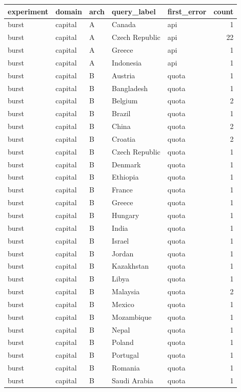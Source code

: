 \begin{tabular}{lllllr}
\toprule
experiment & domain & arch & query_label & first_error & count \\
\midrule
burst & capital & A & Canada & api & 1 \\
burst & capital & A & Czech Republic & api & 22 \\
burst & capital & A & Greece & api & 1 \\
burst & capital & A & Indonesia & api & 1 \\
burst & capital & B & Austria & quota & 1 \\
burst & capital & B & Bangladesh & quota & 1 \\
burst & capital & B & Belgium & quota & 2 \\
burst & capital & B & Brazil & quota & 1 \\
burst & capital & B & China & quota & 2 \\
burst & capital & B & Croatia & quota & 2 \\
burst & capital & B & Czech Republic & quota & 1 \\
burst & capital & B & Denmark & quota & 1 \\
burst & capital & B & Ethiopia & quota & 1 \\
burst & capital & B & France & quota & 1 \\
burst & capital & B & Greece & quota & 1 \\
burst & capital & B & Hungary & quota & 1 \\
burst & capital & B & India & quota & 1 \\
burst & capital & B & Israel & quota & 1 \\
burst & capital & B & Jordan & quota & 1 \\
burst & capital & B & Kazakhstan & quota & 1 \\
burst & capital & B & Libya & quota & 1 \\
burst & capital & B & Malaysia & quota & 2 \\
burst & capital & B & Mexico & quota & 1 \\
burst & capital & B & Mozambique & quota & 1 \\
burst & capital & B & Nepal & quota & 1 \\
burst & capital & B & Poland & quota & 1 \\
burst & capital & B & Portugal & quota & 1 \\
burst & capital & B & Romania & quota & 1 \\
burst & capital & B & Saudi Arabia & quota & 1 \\

\end{tabular}
